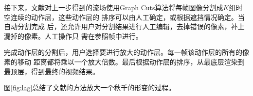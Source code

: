 接下来，文献\cite{liu2005motion}对上一步得到的流场使用Graph
Cuts算法将每帧图像分割成$K$组时空连续的动作层，这些动作层的
排序可以由人工确定，或根据遮挡情况确定。当自动分割完成
后，还允许用户对分割结果进行人工编辑，去掉错误的像素，补上漏掉的像素。人工操作只
需在参照帧中进行。

完成动作层的分割后，用户选择要进行放大的动作层。每一帧该动作层的所有的像素的移动
距离都将乘以一个放大倍数。最后根据动作层的排序，从最底层渲染到最顶层，得到最终的视频结果。%






图\ref{fig:lag}总结了文献\cite{liu2005motion}的方法放大一个秋千的形变的过程。

